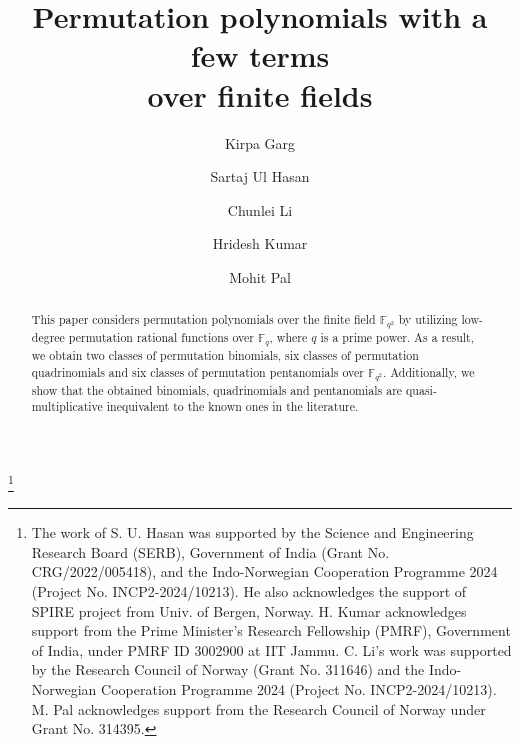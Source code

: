 \documentclass[12pt]{amsart}
\numberwithin{equation}{section}
\theoremstyle{definition}
\newcommand{\F}{\mathbb F}
\begin{document}
\title[Permutation polynomials with  a few terms over finite fields]{Permutation polynomials with  a few terms \\ over finite fields}

\author[K. Garg]{Kirpa Garg}
\address{Department of Mathematics, Indian Institute of Technology Jammu, Jammu 181221, India}
\author[S. U. Hasan]{Sartaj Ul Hasan}
\address{Department of Mathematics, Indian Institute of Technology Jammu, Jammu 181221, India}
\author[C. Li]{Chunlei Li}
\address{Department of Informatics, University of Bergen, PB 7803, N-5020, Bergen, Norway}
\author[H. Kumar]{Hridesh Kumar}
\address{Department of Mathematics, Indian Institute of Technology Jammu, Jammu 181221, India}
\author[M. Pal]{Mohit Pal}
\address{Department of Informatics, University of Bergen, PB 7803, 5020, Bergen, Norway}
\thanks{The work of S. U. Hasan was supported by the Science and Engineering Research Board (SERB), Government of India (Grant No. CRG/2022/005418), and the Indo-Norwegian Cooperation Programme 2024 (Project No. INCP2-2024/10213). He also acknowledges the support of SPIRE project from Univ. of Bergen, Norway. H. Kumar acknowledges support from the Prime Minister’s Research Fellowship (PMRF), Government of India, under PMRF ID 3002900 at IIT Jammu. C. Li’s work was supported by the Research Council of Norway (Grant No. 311646) and the Indo-Norwegian Cooperation Programme 2024 (Project No. INCP2-2024/10213). M. Pal acknowledges support from the Research Council of Norway under Grant No. 314395.}

\begin{abstract}

This paper considers permutation polynomials over the finite field $\F_{q^2}$ by utilizing low-degree permutation rational functions over $\F_q$, where $q$ is a prime power.
As a result, we obtain two classes of permutation binomials, six classes of permutation quadrinomials and six classes of permutation pentanomials over $\F_{q^2}$. Additionally, we show that the obtained binomials, quadrinomials and pentanomials are quasi-multiplicative inequivalent to 
the known ones in the literature.
\end{abstract}
\maketitle
\end{document}
